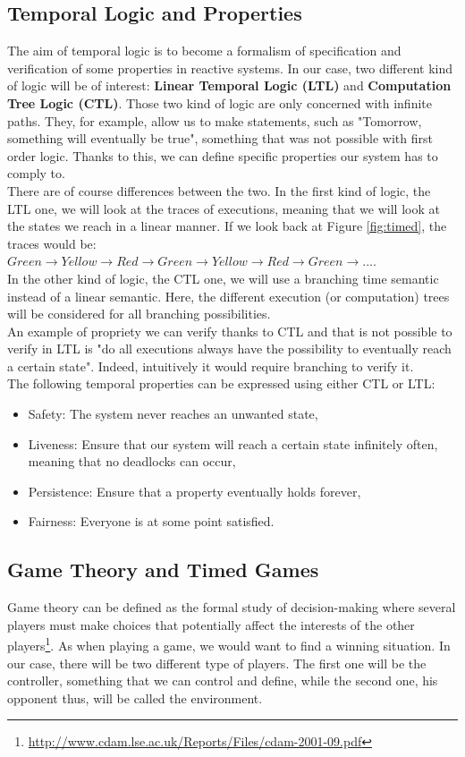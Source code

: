 \subsection{Temporal Logic and Properties}
The aim of temporal logic is to become a formalism of specification and verification of some properties in reactive systems. In our case, two different kind of logic will be of interest: \textbf{Linear Temporal Logic (LTL)} and \textbf{Computation Tree Logic (CTL)}. Those two kind of logic are only concerned with infinite paths. They, for example, allow us to make statements, such as "Tomorrow, something will eventually be true", something that was not possible with first order logic. Thanks to this, we can define specific properties our system has to comply to. \\
There are of course differences between the two. In the first kind of logic, the LTL one, we will look at the traces of executions, meaning that we will look at the states we reach in a linear manner.
If we look back at Figure \ref{fig:timed}, the traces would be:\\ ${Green \rightarrow Yellow \rightarrow Red \rightarrow Green \rightarrow Yellow \rightarrow Red \rightarrow Green \rightarrow ...}$. \\
In the other kind of logic, the CTL one, we will use a branching time semantic instead of a linear semantic. Here, the different execution (or computation) trees will be considered for all branching possibilities. \\
An example of propriety we can verify thanks to CTL and that is not possible to verify in LTL is "do all executions always have the possibility to eventually reach a certain state". Indeed, intuitively it would require branching to verify it. \\
The following temporal properties can be expressed using either CTL or LTL:
\begin{itemize}
    \item Safety: The system never reaches an unwanted state,
    \item Liveness: Ensure that our system will reach a certain state infinitely often, meaning that no deadlocks can occur,
    \item Persistence: Ensure that a property eventually holds forever,
    \item Fairness: Everyone is at some point satisfied.
\end{itemize}

\subsection{Game Theory and Timed Games} \label{sec:game}
Game theory can be defined as the formal study of decision-making where several players must make choices that potentially affect the interests of the other players\footnote{\url{http://www.cdam.lse.ac.uk/Reports/Files/cdam-2001-09.pdf}}. As when playing a game, we would want to find a winning situation. In our case, there will be two different type of players. The first one will be the controller, something that we can control and define, while the second one, his opponent thus, will be called the environment. \\

